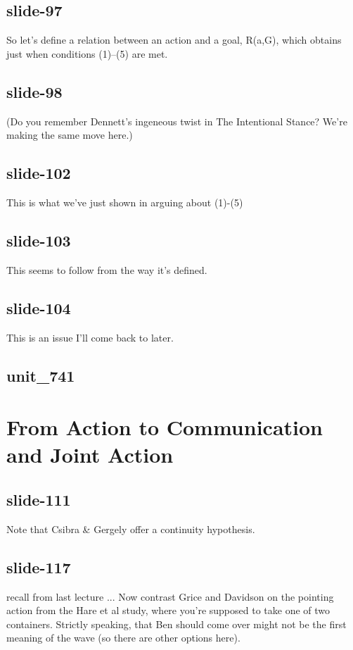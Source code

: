 \documentclass[12pt,\papersize]{extarticle}
\begin{document}
 
\subsection{slide-97}
So let's define a relation between an action and a goal, R(a,G), which obtains just when conditions (1)--(5) are met.
 
 
\subsection{slide-98}
(Do you remember Dennett's ingeneous twist in The Intentional Stance? We're making the same move here.)
 
 
\subsection{slide-102}
This is what we've just shown in arguing about (1)-(5)
 
 
\subsection{slide-103}
This seems to follow from the way it's defined.
 
 
\subsection{slide-104}
This is an issue I'll come back to later.
 
 
\subsection{unit\_741}
 
\section{From Action to Communication and Joint Action}
 
 
\subsection{slide-111}
Note that Csibra \& Gergely offer a continuity hypothesis.
 
 
\subsection{slide-117}
recall from last lecture ...
Now contrast Grice and Davidson on the pointing action from the Hare et al study, where you're supposed to take one of two containers.
Strictly speaking, that Ben should come over might not be the first meaning of the wave (so there are other options here).
 
\end{document}
